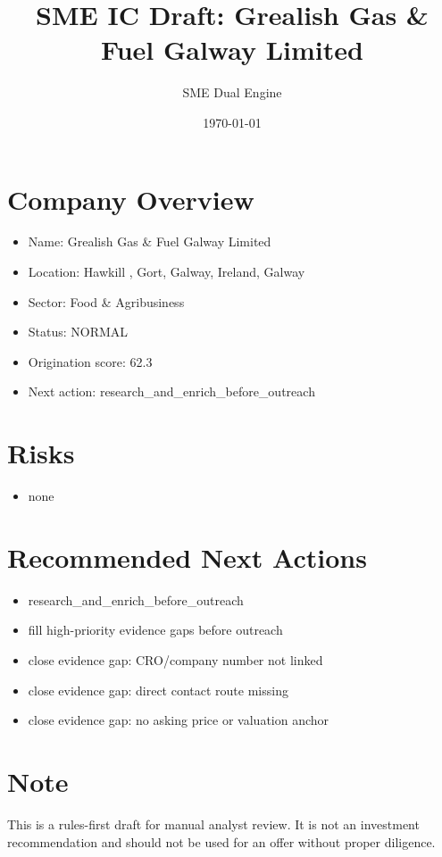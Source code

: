 \documentclass[11pt,a4paper]{article}
\title{SME IC Draft: Grealish Gas \& Fuel Galway Limited}
\author{SME Dual Engine}
\date{\today}
\begin{document}
\maketitle
\section*{Company Overview}
\begin{itemize}[leftmargin=1.4em]
\item Name: Grealish Gas \& Fuel Galway Limited
\item Location: Hawkill , Gort, Galway, Ireland, Galway
\item Sector: Food \& Agribusiness
\item Status: NORMAL
\item Origination score: 62.3
\item Next action: research\_and\_enrich\_before\_outreach
\end{itemize}
\section*{Risks}
\begin{itemize}[leftmargin=1.4em]
\item none
\end{itemize}
\section*{Recommended Next Actions}
\begin{itemize}[leftmargin=1.4em]
\item research\_and\_enrich\_before\_outreach
\item fill high-priority evidence gaps before outreach
\item close evidence gap: CRO/company number not linked
\item close evidence gap: direct contact route missing
\item close evidence gap: no asking price or valuation anchor
\end{itemize}
\section*{Note}
This is a rules-first draft for manual analyst review. It is not an investment
recommendation and should not be used for an offer without proper diligence.
\end{document}
